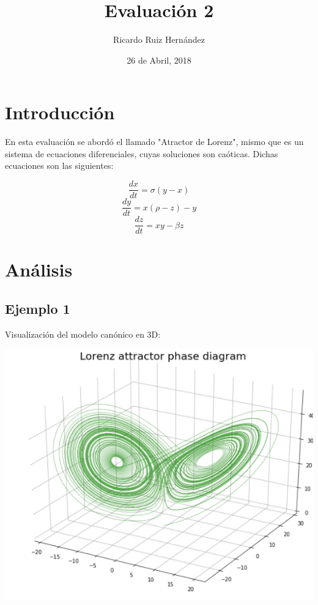 \documentclass{article}
\title{Evaluación 2}
\author{Ricardo Ruiz Hernández}
\date{26 de Abril, 2018}
\begin{document}
\maketitle 
\section{Introducción}
En esta evaluación se abordó el llamado "Atractor de Lorenz", mismo que es un sistema de ecuaciones diferenciales, cuyas soluciones son caóticas. Dichas ecuaciones son las siguientes:

\begin{equation}
\frac{dx}{dt}=\sigma (y-x)
\end{equation}
\begin{equation}
\frac{dy}{dt}= x(\rho -z)-y
\end{equation}
\begin{equation}
\frac{dz}{dt}=xy -\beta z
\end{equation}

\section{Análisis}
\subsection{Ejemplo 1}
Visualización del modelo canónico en 3D: 

\begin{center}
\includegraphics[scale=0.4]{Eval1.png}
\end{center}
\end{document}

